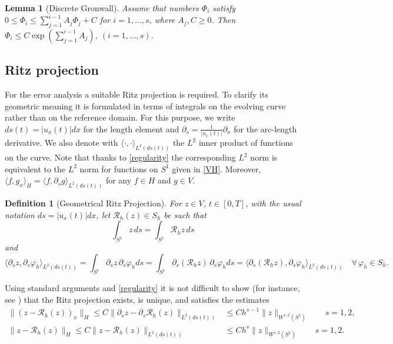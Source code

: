 \documentclass[a4paper,10pt]{article}
\newtheorem{defi}{Definition}[section]
\newtheorem{lemma}[cor]{Lemma}
\numberwithin{equation}{section}
\begin{document}
\begin{lemma}[Discrete Gronwall]\label{discreteGronwall}
Assume that numbers $\Phi_i$ satisfy
$ 
0 \leq \Phi_i \leq \sum_{j=1}^{i-1} A_j \Phi_j+C
$ 
for $i=1, \ldots, s$, where $A_j,C \geq 0$. Then $\Phi_i \leq C \exp ( \sum_{j=1}^{i-1} A_j ) $, $(i=1,\ldots,s)$.
\end{lemma}


\subsection{Ritz projection}


For the error analysis a suitable Ritz projection is required. To clarify its geometric meaning it is formulated in terms of integrals on the evolving curve rather than on the reference domain. For this purpose, we write $ds(t) = |u_{x}(t)| dx$ for the length element and $\partial_{s} = \frac{1}{|u_{x}(t)|} \partial_{x}$ for the arc-length derivative. We also denote with $\langle \cdot , \cdot \rangle_{L^{2}(ds(t))}$ the $L^2$ inner product of functions on the curve. Note that thanks to \eqref{regularity} the corresponding $L^2$ norm is equivalent to the $L^2$ norm for functions on $S^1$ given in \eqref{VH}. Moreover, $\langle f, g_{x} \rangle_{H} = \langle f, \partial_{s} g \rangle_{L^2(ds(t))}$ for any $f \in H$ and $g \in V$.




\begin{defi}[Geometrical Ritz Projection]
For $z \in V$, $t \in [0,T]$, with the usual notation $ds= |u_{x}(t)| dx$, let $\mathcal{R}_{h}(z)\in S_{h} $ be such that
$$ \int_{S^{1}} z \,ds= \int_{S^{1}}\mathcal{R}_{h}z \,ds $$
and
$$ \langle \partial_{s} z, \partial_{s} \varphi_{h}\rangle_{L^{2}(ds(t))}= \int_{S^{1}} \partial_{s} z \, \partial_{s} \varphi_{h} ds = \int_{S^{1}} \partial_{s} (\mathcal{R}_{h} z ) \, \partial_{s} \varphi_{h} ds = \langle \partial_{s} (\mathcal{R}_{h} z ), \partial_{s} \varphi_{h}\rangle_{L^{2}(ds(t))} \quad \forall \, \varphi_{h} \in S_{h}.$$
\end{defi}

Using standard arguments and \eqref{regularity} it is not difficult to show (for instance, see \cite{DE12}) that the Ritz projection exists, is unique, and satisfies the estimates
\begin{align} \label{Ritz1}
 \| (z - \mathcal{R}_{h} (z) )_{x}\|_{H} \leq C \| \partial_{s} z - \partial_{s} \mathcal{R}_{h} (z) \|_{L^{2}(ds(t))} &\leq C h^{s-1} \|z\|_{W^{s,2}(S^{1})} \qquad s=1,2,\\
\label{Ritz2}
 \| z - \mathcal{ R}_{h} (z) \|_{H} \leq C \| z - \mathcal{R}_{h} (z) \|_{L^{2}(ds(t))} &\leq C h^{s} \|z\|_{W^{s,2}(S^{1})} \qquad s=1,2.
\end{align}
\end{document}
